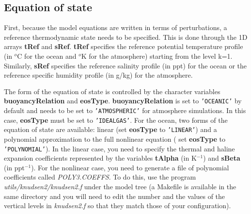 \subsection{Equation of state}

First, because the model equations are written in terms of
perturbations, a reference thermodynamic state needs to be specified.
This is done through the 1D arrays \textbf{tRef} and \textbf{sRef}.
\textbf{tRef} specifies the reference potential temperature profile
(in $^{o}$C for the ocean and $^{o}$K for the atmosphere) starting
from the level k=1. Similarly, \textbf{sRef} specifies the reference
salinity profile (in ppt) for the ocean or the reference specific
humidity profile (in g/kg) for the atmosphere.

The form of the equation of state is controlled by the character
variables \textbf{buoyancyRelation} and \textbf{eosType}.
\textbf{buoyancyRelation} is set to \texttt{'OCEANIC'} by default and
needs to be set to \texttt{'ATMOSPHERIC'} for atmosphere simulations.
In this case, \textbf{eosType} must be set to \texttt{'IDEALGAS'}.
For the ocean, two forms of the equation of state are available:
linear (set \textbf{eosType} to \texttt{'LINEAR'}) and a polynomial
approximation to the full nonlinear equation ( set \textbf{eosType} to
\texttt{'POLYNOMIAL'}). In the linear case, you need to specify the
thermal and haline expansion coefficients represented by the variables
\textbf{tAlpha} (in K$^{-1}$) and \textbf{sBeta} (in ppt$^{-1}$). For
the nonlinear case, you need to generate a file of polynomial
coefficients called \textit{POLY3.COEFFS}. To do this, use the program
\textit{utils/knudsen2/knudsen2.f} under the model tree (a Makefile is
available in the same directory and you will need to edit the number
and the values of the vertical levels in \textit{knudsen2.f} so that
they match those of your configuration).

